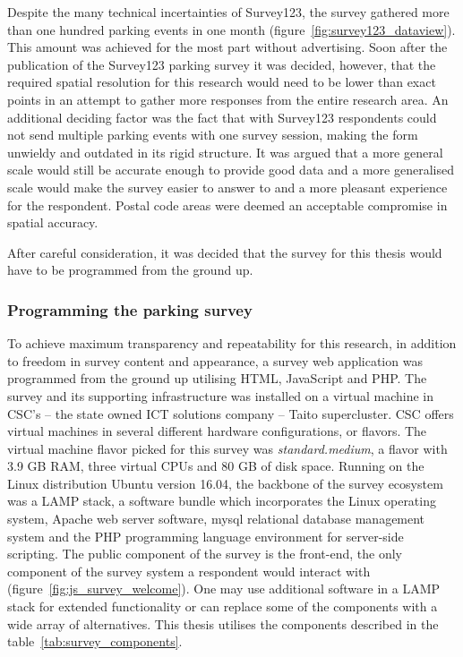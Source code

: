 Despite the many technical incertainties of Survey123, the survey gathered more than one hundred parking events in one month (figure~\ref{fig:survey123_dataview}). This amount was achieved for the most part without advertising. Soon after the publication of the Survey123 parking survey it was decided, however, that the required spatial resolution for this research would need to be lower than exact points in an attempt to gather more responses from the entire research area. An additional deciding factor was the fact that with Survey123 respondents could not send multiple parking events with one survey session, making the form unwieldy and outdated in its rigid structure. It was argued that a more general scale would still be accurate enough to provide good data and a more generalised scale would make the survey easier to answer to and a more pleasant experience for the respondent. Postal code areas were deemed an acceptable compromise in spatial accuracy.

After careful consideration, it was decided that the survey for this thesis would have to be programmed from the ground up.

\subsubsection{Programming the parking survey}
\justify
To achieve maximum transparency and repeatability for this research, in addition to freedom in survey content and appearance, a survey web application was programmed from the ground up utilising HTML, JavaScript and PHP. The survey and its supporting infrastructure was installed on a virtual machine in CSC's -- the state owned ICT solutions company -- Taito supercluster. CSC offers virtual machines in several different hardware configurations, or flavors. The virtual machine flavor picked for this survey was \textit{standard.medium}, a flavor with 3.9 \gls{GB} \gls{RAM}, three virtual \gls{CPU}s and 80 GB of disk space. Running on the Linux distribution Ubuntu version 16.04, the backbone of the survey ecosystem was a LAMP stack, a software bundle which incorporates the Linux operating system, Apache web server software, \gls{mysql} relational database management system and the PHP programming language environment for server-side scripting. The public component of the survey is the front-end, the only component of the survey system a respondent would interact with (figure~\ref{fig:js_survey_welcome}). One may use additional software in a LAMP stack for extended functionality or can replace some of the components with a wide array of alternatives. This thesis utilises the components described in the table~\ref{tab:survey_components}.

